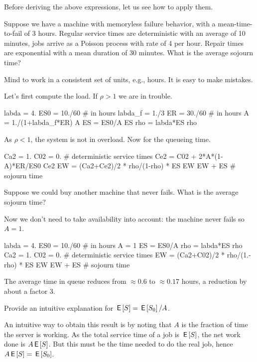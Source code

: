 Before deriving the above expressions, let us see how to apply them. 

\begin{exercise}
  Suppose we have a machine with memoryless failure behavior, with a mean-time-to-fail of $3$ hours. Regular service times are deterministic with an average of 10 minutes, jobs arrive as a Poisson process with rate of 4 per hour.  Repair times are exponential with a mean duration of 30 minutes. What is the average sojourn time?
  \begin{hint}
    Mind to work in a consistent set of units, e.g., hours. It is easy to make mistakes. 
  \end{hint}
  \begin{solution}
Let's first compute the load. If $\rho>1$ we are in trouble.
    \begin{pyconsole}
labda = 4.
ES0 = 10./60 # in hours
labda_f = 1./3
ER = 30./60 # in hours
A = 1./(1+labda_f*ER)
A
ES = ES0/A
ES
rho = labda*ES
rho
    \end{pyconsole}
As $\rho<1$, the system is not in overload. Now for the queueing time.
\begin{pyconsole}
Ca2 = 1.
C02 = 0. # deterministic service times
Ce2 = C02 + 2*A*(1-A)*ER/ES0
Ce2
EW = (Ca2+Ce2)/2 * rho/(1-rho) * ES
EW
EW + ES # sojourn time
\end{pyconsole}
  \end{solution}
\end{exercise}

\begin{extra}
  Suppose we could buy another machine that never fails. What is the average sojourn time?
  \begin{solution}
Now we don't need to take availability into account: the machine never fails so $A=1$. 
    \begin{pyconsole}
labda = 4.
ES0 = 10./60 # in hours
A = 1
ES = ES0/A
rho = labda*ES
rho
Ca2 = 1.
C02 = 0. # deterministic service times
EW = (Ca2+C02)/2 * rho/(1.-rho) * ES
EW
EW + ES # sojourn time
\end{pyconsole}
The average time in queue reduces from $\approx 0.6$ to $\approx 0.17$ hours, a reduction by about a factor 3. 
\end{solution}
\end{extra}

\begin{extra}\label{ex:79}
  Provide an intuitive explanation for $\,\mathsf{E}\left[S\right] = \,\mathsf{E}\left[S_0\right]/A$.
  \begin{solution}
An intuitive way to obtain this result is by noting that $A$ is the fraction of time the server is working. As the total service time of a job is $\,\mathsf{E}\left[S\right]$, the net work done is $ A\,\mathsf{E}\left[S\right]$. But this must be the time needed to do the real job, hence $A \,\mathsf{E}\left[S\right] = \,\mathsf{E}\left[S_0\right]$.  
  \end{solution}
\end{extra}


